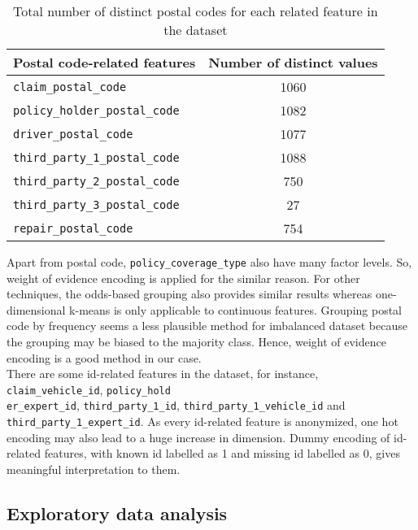 \documentclass[12pt]{article}
\begin{document}
\begin{table}[h]
	\centering
	\begin{tabular}{|l|c|}
	\hline
	Postal code-related features & Number of distinct values \\
	\hline
	\texttt{claim\_postal\_code} & 1060 \\
	\texttt{policy\_holder\_postal\_code} & 1082 \\
	\texttt{driver\_postal\_code} & 1077 \\
	\texttt{third\_party\_1\_postal\_code} & 1088 \\
	\texttt{third\_party\_2\_postal\_code} & 750 \\
	\texttt{third\_party\_3\_postal\_code} & 27 \\
	\texttt{repair\_postal\_code} & 754 \\
	\hline
	\end{tabular}
	\caption{Total number of distinct postal codes for each related feature in the dataset}
\end{table}

Apart from postal code, \texttt{policy\_coverage\_type} also have many factor levels. So, weight of evidence encoding is applied for the similar reason. For other techniques, the odds-based grouping also provides similar results whereas one-dimensional k-means is only applicable to continuous features. Grouping postal code by frequency seems a less plausible method for imbalanced dataset because the grouping may be biased to the majority class. Hence, weight of evidence encoding is a good method in our case. \\

There are some id-related features in the dataset, for instance, \texttt{claim\_vehicle\_id}, \texttt{policy\_hold\\er\_expert\_id}, \texttt{third\_party\_1\_id}, \texttt{third\_party\_1\_vehicle\_id} and \texttt{third\_party\_1\_expert\_id}. As every id-related feature is anonymized, one hot encoding may also lead to a huge increase in dimension. Dummy encoding of id-related features, with known id labelled as 1 and missing id labelled as 0, gives meaningful interpretation to them.

\clearpage

\subsection*{Exploratory data analysis}
\end{document}
